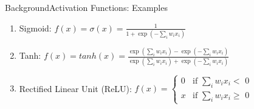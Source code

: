 \documentclass[handout]{beamer}
\begin{document}
\begin{frame}{Background}{Activation Functions: Examples}


\begin{enumerate}

  \item Sigmoid: $ f(x) = \sigma(x) = \frac{1}{1+\exp(-\sum_i w_i x_i)}$ \\

  \item Tanh: $ f(x) = tanh(x) = \frac{\exp(\sum_i w_i x_i) - \exp(-\sum_i w_i x_i)}{\exp(\sum_i w_i x_i) + \exp(-\sum_i w_i x_i)}$ \\

  \item Rectified Linear Unit (ReLU): $f(x) = \left\{\begin{array}{ll}
      0 & \mbox{if } \sum_i w_i x_i < \mbox{ 0} \\
      x & \mbox{if } \sum_i w_i x_i \geq \mbox{ 0}
      \end{array}$ \\
\end{enumerate}

\vspace{0.5cm}


\end{frame}
\end{document}
